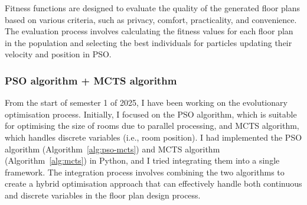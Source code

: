 \documentclass[]{article}
\begin{document}
Fitness functions are designed to evaluate the quality of the generated floor plans based on various criteria, such as privacy, comfort, practicality, and convenience. The evaluation process involves calculating the fitness values for each floor plan in the population and selecting the best individuals for particles updating their velocity and position in PSO.

\subsubsection{PSO algorithm + MCTS algorithm}
From the start of semester 1 of 2025, I have been working on the evolutionary optimisation process. Initially, I focused on the PSO algorithm, which is suitable for optimising the size of rooms due to parallel processing, and MCTS algorithm, which handles discrete variables (i.e., room position). I had implemented the PSO algorithm (Algorithm~\ref{alg:pso-mcts}) and MCTS algorithm (Algorithm~\ref{alg:mcts}) in Python, and I tried integrating them into a single framework. The integration process involves combining the two algorithms to create a hybrid optimisation approach that can effectively handle both continuous and discrete variables in the floor plan design process.
\end{document}
